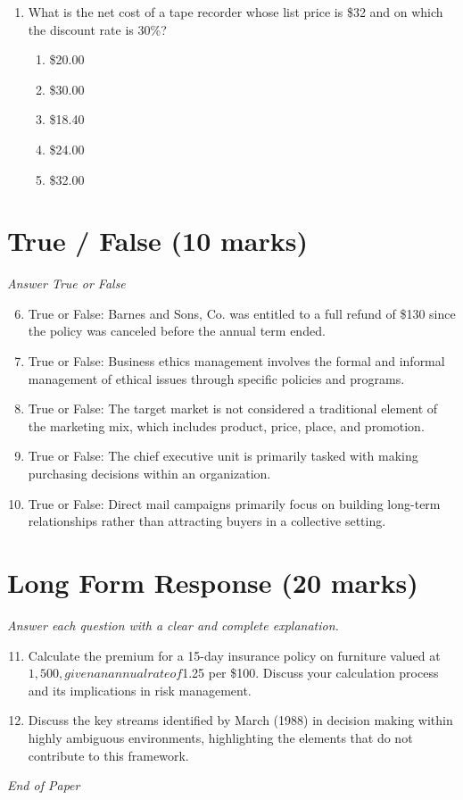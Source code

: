 \documentclass[12pt]{article}
\begin{document}
\begin{enumerate}[label=\arabic*.]
\begin{enumerate}[label=(\alph*)]
    \item 370 kilos
    \item 380 kilos
    \item 345 kilos
    \item 375 kilos
    \item 400 kilos
\end{enumerate}
\item What is the net cost of a tape recorder whose list price is \$32 and on which the discount rate is 30\%?
\begin{enumerate}[label=(\alph*)]
    \item \$20.00
    \item \$30.00
    \item \$18.40
    \item \$24.00
    \item \$32.00
\end{enumerate}
\end{enumerate}

\section*{True / False (10 marks)}
\textit{Answer True or False}
\begin{enumerate}[label=\arabic*.]
\setcounter{enumi}{5}
\item True or False: Barnes and Sons, Co. was entitled to a full refund of \$130 since the policy was canceled before the annual term ended.
\item True or False: Business ethics management involves the formal and informal management of ethical issues through specific policies and programs.
\item True or False: The target market is not considered a traditional element of the marketing mix, which includes product, price, place, and promotion.
\item True or False: The chief executive unit is primarily tasked with making purchasing decisions within an organization.
\item True or False: Direct mail campaigns primarily focus on building long-term relationships rather than attracting buyers in a collective setting.
\end{enumerate}

\section*{Long Form Response (20 marks)}
\textit{Answer each question with a clear and complete explanation.}
\begin{enumerate}[label=\arabic*.]
\setcounter{enumi}{10}
\item Calculate the premium for a 15-day insurance policy on furniture valued at $1,500, given an annual rate of $1.25 per \$100. Discuss your calculation process and its implications in risk management.
\item Discuss the key streams identified by March (1988) in decision making within highly ambiguous environments, highlighting the elements that do not contribute to this framework.
\end{enumerate}

\vfill
\noindent\textit{End of Paper}
\end{document}
